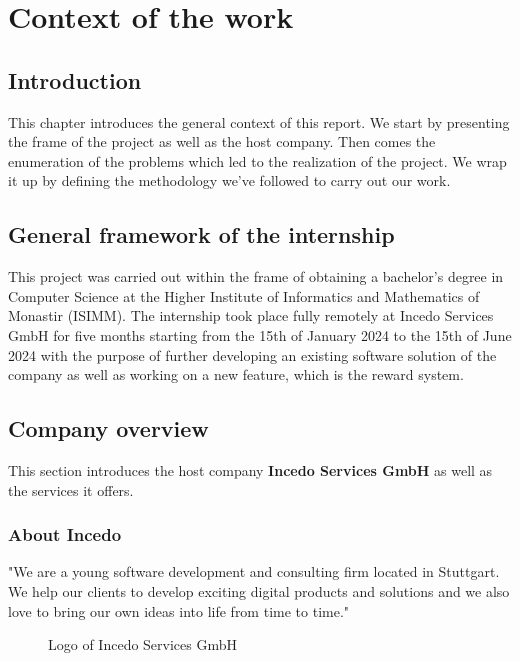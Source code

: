\chapter{Context of the work}
\minitoc
\newpage

\setcounter{secnumdepth}{0} %
\section{Introduction}
This chapter introduces the general context of this report.
We start by presenting the frame of the project as well as the host company.
Then comes the enumeration of the problems which led to the realization of the project.
We wrap it up by defining the methodology we’ve followed to carry out our work.

\setcounter{secnumdepth}{2} %
\section{General framework of the internship}
This project was carried out within the frame of obtaining a bachelor’s degree in Computer Science at the Higher Institute of Informatics and Mathematics of Monastir (ISIMM).
The internship took place fully remotely at Incedo Services GmbH for five months starting from the 15th of January 2024 to the 15th of June 2024 with the purpose of further developing an existing software solution of the company as well as working on a new feature, which is the reward system.

\section{Company overview}
This section introduces the host company {\bf Incedo Services GmbH} as well as the services it offers.
\subsection{About Incedo}
"We are a young software development and consulting firm located in Stuttgart.
We help our clients to develop exciting digital products and solutions and we also love to bring our own ideas into life from time to time." \cite{about-incedo}
\begin{figure}[H]
    \centering
    \caption{Logo of Incedo Services GmbH}
    \label{fig:logo-of-incedo}
\end{figure}

